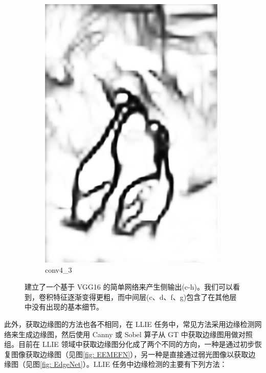 \documentclass[a4paper]{ctexart}
\begin{document}
\begin{figure}[htb]
\begin{subfigure}{0.2\textwidth}
			\includegraphics[width=\linewidth]{picture/LLIE/RCF/conv4_3}
			\captionsetup{font=scriptsize}
			\caption{conv4\_3}
			\label{fig: conv4_3}	
		\end{subfigure}
		\caption{
			\label{fig: Motivation of RCF}
			建立了一个基于 VGG16\cite{simonyan2014very} 的简单网络来产生侧输出(c-h)。我们可以看到，卷积特征逐渐变得更粗，而中间层(c、d、f、g)包含了在其他层中没有出现的基本细节。
		}
	\end{figure}
	\FloatBarrier
	
	此外，获取边缘图的方法也各不相同，在 LLIE 任务中，常见方法采用边缘检测网络来生成边缘图，然后使用 Canny 或 Sobel 算子\cite{maini2009study}从 GT 中获取边缘图用做对照组。目前在 LLIE 领域中获取边缘图分化成了两个不同的方向，一种是通过初步恢复图像获取边缘图（见图\ref{fig: EEMEFN}），另一种是直接通过弱光图像以获取边缘图（见图\ref{fig: EdgeNet}）。LLIE 任务中边缘检测的主要有下列方法：
	
\end{document}
